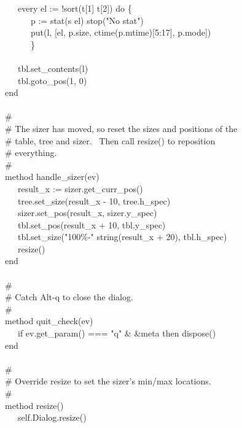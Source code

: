 {\>   \ \ \ every el := !sort(t[1] {\textbar}{\textbar}{\textbar} t[2])
do \{ \\
\>   \ \ \ \ \ \ p := stat(s {\textbar}{\textbar} el) {\textbar}
stop("No stat") \\
\>   \ \ \ \ \ \ put(l, [el, p.size, ctime(p.mtime)[5:17], p.mode]) \\
\>   \ \ \ \ \ \ \} \\
\ \\
\>   \ \ \ tbl.set\_contents(l) \\
\>   \ \ \ tbl.goto\_pos(1, 0) \\
\>   end \\
\ \\
\>   \# \\
\>   \# The sizer has moved, so reset the sizes and positions of the \\
\>   \# table, tree and sizer. \ Then call resize() to reposition \\
\>   \# everything. \\
\>   \# \\
\>   method handle\_sizer(ev) \\
\>   \ \ \ result\_x := sizer.get\_curr\_pos() \\
\>   \ \ \ tree.set\_size(result\_x - 10, tree.h\_spec) \\
\>   \ \ \ sizer.set\_pos(result\_x, sizer.y\_spec) \\
\>   \ \ \ tbl.set\_pos(result\_x + 10, tbl.y\_spec) \\
\>   \ \ \ tbl.set\_size("100\%-" {\textbar}{\textbar} string(result\_x + 20), tbl.h\_spec) \\
\>   \ \ \ resize() \\
\>   end \\
\ \\
\>   \# \\
\>   \# Catch Alt-q to close the dialog. \\
\>   \# \\
\>   method quit\_check(ev) \\
\>   \ \ \ if ev.get\_param() === "q" \&
\&meta then dispose() \\
\>   end \\
\ \\
\>   \# \\
\>   \# Override resize to set the sizer's min/max
locations. \\
\>   \# \\
\>   method resize() \\
\>   \ \ \ self.Dialog.resize() \\
}
